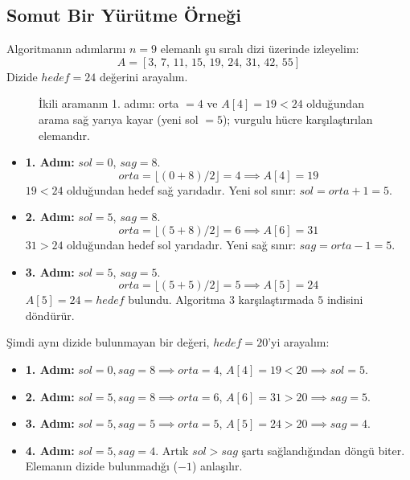 \subsection{Somut Bir Yürütme Örneği}

Algoritmanın adımlarını $n = 9$ elemanlı şu sıralı dizi üzerinde izleyelim:
\[ A = [3, \, 7, \, 11, \, 15, \, 19, \, 24, \, 31, \, 42, \, 55] \]
Dizide $hedef = 24$ değerini arayalım.

\begin{figure}[ht]
\centering
{}
\caption{İkili aramanın 1. adımı: orta $= 4$ ve $A[4] = 19 < 24$ olduğundan arama
sağ yarıya kayar (yeni sol $= 5$); vurgulu hücre karşılaştırılan elemandır.}
\end{figure}

\begin{itemize}
    \item \textbf{1. Adım:} $sol = 0$, $sag = 8$.
    \[ orta = \lfloor (0 + 8) / 2 \rfloor = 4 \implies A[4] = 19 \]
    $19 < 24$ olduğundan hedef sağ yarıdadır. Yeni sol sınır: $sol = orta + 1 = 5$.
    \item \textbf{2. Adım:} $sol = 5$, $sag = 8$.
    \[ orta = \lfloor (5 + 8) / 2 \rfloor = 6 \implies A[6] = 31 \]
    $31 > 24$ olduğundan hedef sol yarıdadır. Yeni sağ sınır: $sag = orta - 1 = 5$.
    \item \textbf{3. Adım:} $sol = 5$, $sag = 5$.
    \[ orta = \lfloor (5 + 5) / 2 \rfloor = 5 \implies A[5] = 24 \]
    $A[5] = 24 = hedef$ bulundu. Algoritma $3$ karşılaştırmada $5$ indisini döndürür.
\end{itemize}

Şimdi aynı dizide bulunmayan bir değeri, $hedef = 20$'yi arayalım:
\begin{itemize}
    \item \textbf{1. Adım:} $sol = 0, sag = 8 \implies orta = 4$, $A[4] = 19 < 20 \implies sol = 5$.
    \item \textbf{2. Adım:} $sol = 5, sag = 8 \implies orta = 6$, $A[6] = 31 > 20 \implies sag = 5$.
    \item \textbf{3. Adım:} $sol = 5, sag = 5 \implies orta = 5$, $A[5] = 24 > 20 \implies sag = 4$.
    \item \textbf{4. Adım:} $sol = 5, sag = 4$. Artık $sol > sag$ şartı sağlandığından döngü biter. Elemanın dizide bulunmadığı ($ -1 $) anlaşılır.
\end{itemize}

